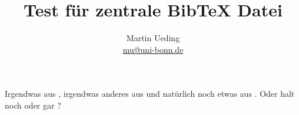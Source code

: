 \documentclass[11pt]{article}
\title{Test für zentrale BibTeX Datei}
\author{Martin Ueding \\ \href{mailto:mu@uni-bonn.de}{mu@uni-bonn.de}}
\begin{document}
\maketitle

Irgendwas aus \cite{penrose-cycles_of_time}, irgendwas anderes aus \cite{penrose-computerdenken} und natürlich noch etwas aus \cite{penrose-road_to_reality}. Oder halt noch \cite{mcconnel-rapid_development} oder gar \cite{mcconnel-code_complete}?





\end{document}
